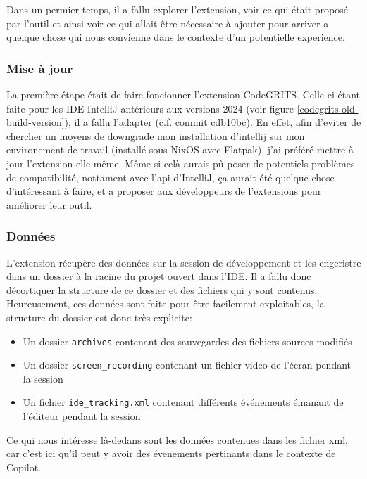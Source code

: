 Dans un permier temps, il a fallu explorer l'extension, voir ce qui était proposé par l'outil et ainsi voir ce qui allait être nécessaire à ajouter
pour arriver a quelque chose qui nous convienne dans le contexte d'un potentielle experience.


\subsubsection{Mise à jour}

La première étape était de faire foncionner l'extension CodeGRITS.
Celle-ci étant faite pour les IDE IntelliJ antérieurs aux versions 2024 (voir figure \ref{codegrits-old-build-version}), il a fallu l'adapter
(c.f. commit \href{https://github.com/codegrits/CodeGRITS/commit/cdb10bcba529d050bfcb6c3693256f0e18450dad}{cdb10bc}).
En effet, afin d'eviter de chercher un moyens de downgrade mon installation d'intellij sur mon environement de travail (installé sous NixOS avec Flatpak),
j'ai préféré mettre à jour l'extension elle-même.
Même si celà aurais pû poser de potentiels problèmes de compatibilité, nottament avec l'api d'IntelliJ, ça aurait été quelque chose d'intéressant à faire, et a proposer aux développeurs
de l'extensions pour améliorer leur outil.


\subsubsection{Données}

L'extension récupère des données sur la session de développement et les engeristre dans un dossier à la racine du projet ouvert dans l'IDE.
Il a fallu donc décortiquer la structure de ce dossier et des fichiers qui y sont contenus. Heureusement, ces données sont faite pour être facilement exploitables, la structure du dossier est donc très explicite:

\begin{itemize}
  \item Un dossier \lstinline{archives} contenant des sauvegardes des fichiers sources modifiés
  \item Un dossier \lstinline{screen_recording} contenant un fichier video de l'écran pendant la session
  \item Un fichier \lstinline{ide_tracking.xml} contenant différents événements émanant de l'éditeur pendant la session
\end{itemize}

Ce qui nous intéresse là-dedans sont les données contenues dans les fichier xml, car c'est ici qu'il peut y avoir des évenements pertinants dans le contexte de Copilot.

